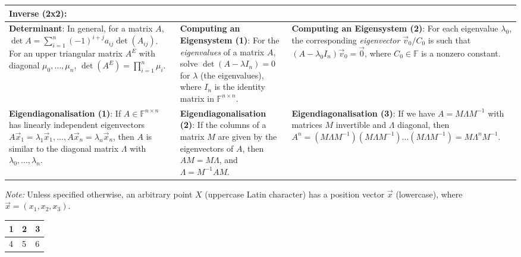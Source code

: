 \begin{tabular}{|m{.31\linewidth}|m{.31\linewidth}|m{.31\linewidth}|}
\textbf{Inverse (2x2)}:
    \smash{$\displaystyle
        A = \begin{pmatrix}
            a & b \\
            c & d
        \end{pmatrix},\,
        A^{-1} = \frac{1}{\det A}
        \begin{pmatrix}
            d & -b \\
            -c & a
        \end{pmatrix}
    $} \\

\hline

\textbf{Determinant}:
    In general, for a matrix $ A $, $ \det A = \sum_{i=1}^n (-1)^{i+j} a_{ij}
    \det(A_{ij}) $. For an upper triangular matrix $ A^E $ with diagonal $
    \mu_0, \ldots, \mu_n $, $ \det\left(A^E\right) = \prod_{i=1}^n \mu_i $. &

\textbf{Computing an Eigensystem (1)}:
    For the \emph{eigenvalues} of a matrix $ A $, solve $ \det(A-\lambda
    I_n) = 0 $ for $ \lambda $ (the eigenvalues), where $ I_n $ is the identity
    matrix in $ \mathbb{F}^{n \times n} $. &

\textbf{Computing an Eigensystem (2)}:
    For each eigenvalue $ \lambda_0 $, the corresponding \emph{eigenvector} $
    \vec{v}_0/C_0 $ is such that $ (A - \lambda_0 I_n) \vec{v}_0 = \vec{0} $,
    where $ C_0 \in \mathbb{F} $ is a nonzero constant. \\

\hline

\textbf{Eigendiagonalisation (1)}:
    If $ A \in \mathbb{F}^{n \times n} $ has linearly independent eigenvectors $
    A\vec{x}_1 = \lambda_1\vec{x}_1, \ldots, A\vec{x}_n = \lambda_n\vec{x}_n $,
    then $ A $ is similar to the diagonal matrix $ \Lambda $ with $ \lambda_0,
    \ldots, \lambda_n $. &

\textbf{Eigendiagonalisation (2)}:
    If the columns of a matrix $ M $ are given by the eigenvectors of $ A $,
    then $ AM = M\Lambda $, and $ \Lambda = M^{-1}AM $. &

\textbf{Eigendiagonalisation (3)}:
    If we have $ A = M \Lambda M^{-1} $ with matrices $ M $ invertible and $
    \Lambda $ diagonal, then $ A^n = (M \Lambda M^{-1})(M \Lambda M^{-1}) \ldots
    (M \Lambda M^{-1}) = M \Lambda^n M^{-1} $. \\

\hline
\end{tabular}

\vfill
\emph{Note:} Unless specified otherwise, an arbitrary point $ X $ (uppercase
Latin character) has a position vector $ \vec{x} $ (lowercase), where $ \vec{x}
= (x_1, x_2, x_3) $.
\vfill

\clearpage
\begin{tabular}{|m{.31\linewidth}|m{.31\linewidth}|m{.31\linewidth}|}
    \hline
    1 & 2 & 3 \\
    \hline
    4 & 5 & 6 \\
    \hline
\end{tabular}


